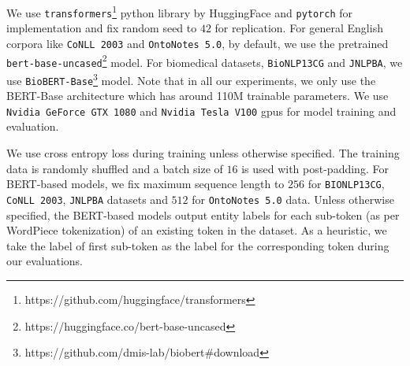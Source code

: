 We use \texttt{transformers}\footnote{https://github.com/huggingface/transformers} python library by HuggingFace and \texttt{pytorch} for implementation and fix random seed to $42$ for replication. For general English corpora like \texttt{CoNLL 2003} and \texttt{OntoNotes 5.0}, by default, we use the pretrained \texttt{bert-base-uncased}\footnote{https://huggingface.co/bert-base-uncased} model. For biomedical datasets, \texttt{BioNLP13CG} and \texttt{JNLPBA}, we use \texttt{BioBERT-Base}\footnote{https://github.com/dmis-lab/biobert\#download} model. Note that in all our experiments, we only use the BERT-Base architecture which has around 110M trainable parameters. We use \texttt{Nvidia GeForce GTX 1080} and \texttt{Nvidia Tesla V100} gpus for model training and evaluation.

We use cross entropy loss during training unless otherwise specified. The training data is randomly shuffled and a batch size of $16$ is used with post-padding. For BERT-based models, we fix maximum sequence length to $256$ for \texttt{BIONLP13CG}, \texttt{CoNLL 2003}, \texttt{JNLPBA} datasets and $512$ for \texttt{OntoNotes 5.0} data. Unless otherwise specified, the BERT-based models output entity labels for each sub-token (as per WordPiece tokenization) of an existing token in the dataset. As a heuristic, we take the label of first sub-token as the label for the corresponding token during our evaluations.
